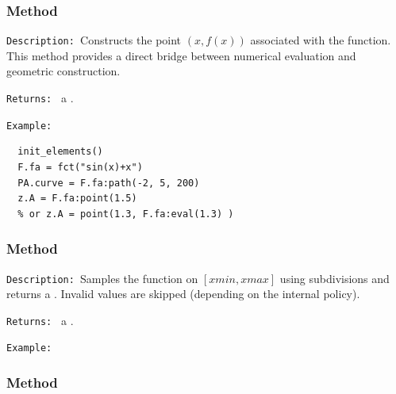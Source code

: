 \subsubsection{Method }
\label{ssub:method_fct_point}

\texttt{Description: }Constructs the point $(x,f(x))$ associated with the function.
This method provides a direct bridge between numerical evaluation and geometric
construction.

\medskip
\texttt{Returns: } a .

\medskip
\texttt{Example: }
\begin{verbatim}
  init_elements()
  F.fa = fct("sin(x)+x")
  PA.curve = F.fa:path(-2, 5, 200)
  z.A = F.fa:point(1.5)
  % or z.A = point(1.3, F.fa:eval(1.3) )
\end{verbatim}

\subsubsection{Method }
\label{ssub:method_fct_path}

\texttt{Description: }Samples the function on $[xmin,xmax]$ using 
subdivisions and returns a . Invalid values are skipped (depending
on the internal policy).

\medskip
\texttt{Returns: } a .

\medskip
\texttt{Example: }

\begin{tkzexample}[latex=.5\textwidth]
\end{tkzexample}

%


\subsubsection{Method }
\label{ssub:method_fct_set_scale}

